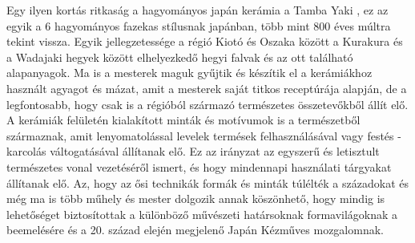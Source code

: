 \vspace{2 mm}
Egy ilyen kortás ritkaság a hagyományos japán kerámia a Tamba Yaki \cite{tambayaki}, ez az egyik a 6 hagyományos fazekas stílusnak japánban, több mint 800 éves múltra tekint vissza. Egyik jellegzetessége a régió Kiotó és Oszaka között a Kurakura és a Wadajaki hegyek között elhelyezkedő hegyi falvak és az ott található alapanyagok. Ma is a mesterek maguk gyűjtik és készítik el a kerámiákhoz használt agyagot és mázat, amit a mesterek saját titkos receptúrája alapján, de a legfontosabb, hogy csak is a régióból származó természetes összetevőkből állít elő. A kerámiák felületén kialakított minták és motívumok is a természetből származnak, amit lenyomatolással levelek termések felhasználásával vagy festés - karcolás váltogatásával állítanak elő. Ez az irányzat az egyszerű és letisztult természetes vonal vezetéséről ismert, és hogy mindennapi használati tárgyakat állítanak elő. Az, hogy az ősi technikák formák és minták túlélték  a századokat és még ma is több műhely és mester dolgozik annak köszönhető, hogy mindig is lehetőséget biztosítottak a különböző művészeti határsoknak formavilágoknak a beemelésére és a 20. század elején megjelenő Japán Kézműves mozgalomnak.






